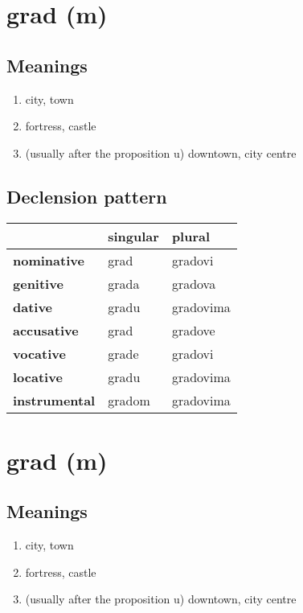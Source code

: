 \filbreak
\section{grad (m)}
\subsection*{Meanings}
\begin{enumerate}
\item city, town
\item fortress, castle
\item (usually after the proposition u) downtown, city centre
\end{enumerate}
\subsection*{Declension pattern}
\begin{tabularx}{\linewidth}{Xll}
\toprule
{} & singular &     plural \\
\midrule
\textbf{nominative  } &     grad &    gradovi \\
\textbf{genitive    } &    grada &    gradova \\
\textbf{dative      } &    gradu &  gradovima \\
\textbf{accusative  } &     grad &    gradove \\
\textbf{vocative    } &    grade &    gradovi \\
\textbf{locative    } &    gradu &  gradovima \\
\textbf{instrumental} &   gradom &  gradovima \\
\bottomrule
\end{tabularx}

\filbreak
\section{grad (m)}
\subsection*{Meanings}
\begin{enumerate}
\item city, town
\item fortress, castle
\item (usually after the proposition u) downtown, city centre
\end{enumerate}
